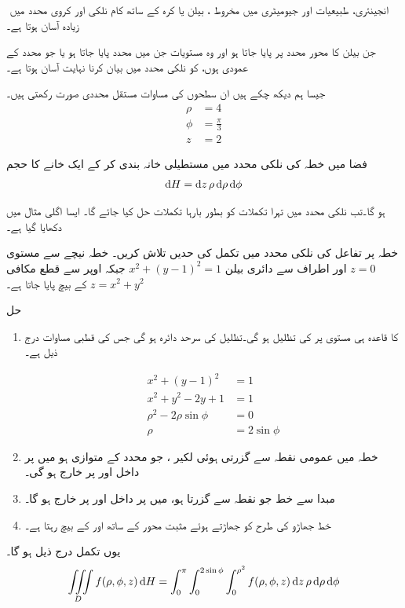 ﻿
انجینئری،  طبیعیات اور جیومیٹری میں  مخروط ، بیلن یا کرہ کے ساتھ کام  نلکی اور کروی محدد میں زیادہ آسان ہوتا ہے۔

جن  بیلن  کا محور   محدد   پر پایا جاتا ہو اور وہ مستویات جن میں  محدد پایا جاتا ہو یا جو  محدد کے عمودی ہوں، کو نلکی محدد میں بیان کرنا  نہایت  آسان ہوتا ہے۔


جیسا ہم دیکھ چکے ہیں ان سطحوں کی مساوات  مستقل محددی صورت رکھتی ہیں۔
\begin {align*}
\rho  & = 4\\
\phi & =\frac{\pi}{3}\\
z &=2
\end {align*}

فضا میں خطہ کی نلکی محدد  میں مستطیلی خانہ بندی  کر کے  ایک خانے کا  حجم 
\begin {align*}
\dif H = \dif z \,\rho \dif \rho \dif \phi
\end {align*}


ہو گا۔تب نلکی محدد میں تہرا تکملات کو  بطور بارہا تکملات حل کیا جائے گا۔ ایسا  اگلی مثال میں دکھایا گیا ہے۔


خطہ  پر تفاعل   کی نلکی محدد میں تکمل  کی حدیں تلاش کریں۔ خطہ  نیچے سے مستوی  
\(z=0\)
اور اطراف سے دائری بیلن
\(x^2+(y-1)^2=1\)
 جبکہ اوپر سے قطع مکافی
\(z=x^2+y^2\)
 کے بیچ پایا جاتا ہے۔


حل
\begin {enumerate}[1.]
\item
{}\quad
{}  کا  قاعدہ ہی  مستوی  پر  کی تظلیل   ہو  گی۔تظلیل  کی سرحد دائرہ  ہو گی جس کی قطبی مساوات درج ذیل ہے۔


\begin {align*}
x^2+(y-1)^2&=1\\
x^2+y^2-2y+1&=1\\
\rho^2-2\rho\sin\phi&=0\\
\rho&=2\sin\phi
\end {align*}
\item
{}\quad
خطہ  میں عمومی نقطہ  سے گزرتی ہوئی لکیر ، جو  محدد کے متوازی  ہو  میں    پر داخل اور  پر خارج  ہو گی۔
\item
{}\quad
مبدا سے  خط  جو نقطہ   سے گزرتا ہو،  میں  پر داخل اور  پر خارج ہو گا۔
\item
{}\quad
خط   جھاڑو کی طرح  کو جھاڑتے ہوئے مثبت  محور کے ساتھ  اور کے بیچ رہتا ہے۔
\end {enumerate}
یوں تکمل درج ذیل ہو گا۔
\begin{align*}
\iiint\limits_D f(\rho,\phi,z)\dif H=\int_{0}^{\pi}\int_0^{2\sin\phi}\int_{0}^{\rho^2}f(\rho,\phi,z)\dif z \,\rho\dif \rho\dif \phi
\end{align*}


